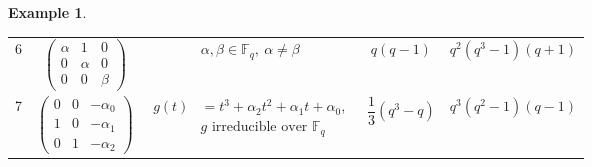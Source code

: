 \documentclass[11pt,twoside]{amsart}
\newcommand{\F}{\mathbb{F}}
\theoremstyle{definition} %
\newtheorem{example}[lemma]{Example}
\begin{document}
\begin{example}
\begin{center}
\begin{center}
\begin{longtable}{ccccc}
6
&
$\begin{pmatrix}
\alpha&1&0\\
0&\alpha&0\\
0&0&\beta
\end{pmatrix}$
&
$\alpha,\beta\in\F_q,\ \alpha\neq\beta$
&
$q(q-1)$
&
$q^2(q^3-1)(q+1)$
\\

7
&
$\begin{pmatrix}
0&0&-\alpha_0\\
1&0&-\alpha_1\\
0&1&-\alpha_2
\end{pmatrix}$
&
$\begin{aligned}
g(t)&=t^3+\alpha_2t^2+\alpha_1t+\alpha_0,\\
& g \text{ irreducible over }\F_q
\end{aligned}$
&
$\dfrac{1}{3}(q^3-q)$
&
$q^3(q^2-1)(q-1)$
\\


\end{longtable}
\end{center}
\end{center}
\end{example}
\end{document}
